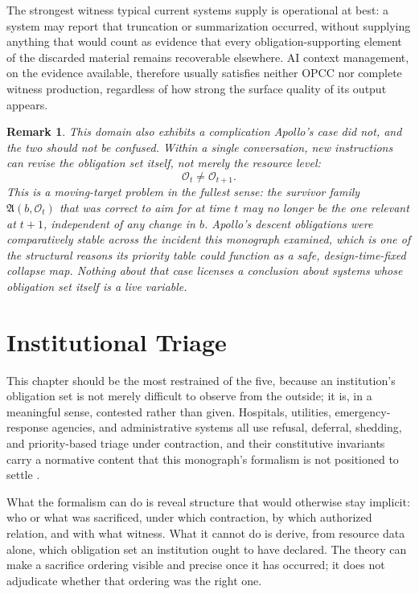\documentclass[11pt]{report}
\newtheorem{remark}[definition]{Remark}
\begin{document}
The strongest witness typical current systems supply is operational at best: a system may report that truncation or summarization occurred, without supplying anything that would count as evidence that every obligation-supporting element of the discarded material remains recoverable elsewhere. AI context management, on the evidence available, therefore usually satisfies neither OPCC nor complete witness production, regardless of how strong the surface quality of its output appears.

\begin{remark}
This domain also exhibits a complication Apollo's case did not, and the two should not be confused. Within a single conversation, new instructions can revise the obligation set itself, not merely the resource level:
\[
\mathcal O_t \ne \mathcal O_{t+1}.
\]
This is a moving-target problem in the fullest sense: the survivor family $\mathfrak A(b, \mathcal O_t)$ that was correct to aim for at time $t$ may no longer be the one relevant at $t+1$, independent of any change in $b$. Apollo's descent obligations were comparatively stable across the incident this monograph examined, which is one of the structural reasons its priority table could function as a safe, design-time-fixed collapse map. Nothing about that case licenses a conclusion about systems whose obligation set itself is a live variable.
\end{remark}

\chapter{Institutional Triage}

This chapter should be the most restrained of the five, because an institution's obligation set is not merely difficult to observe from the outside; it is, in a meaningful sense, contested rather than given. Hospitals, utilities, emergency-response agencies, and administrative systems all use refusal, deferral, shedding, and priority-based triage under contraction, and their constitutive invariants carry a normative content that this monograph's formalism is not positioned to settle \cite{lipsky1980,iom2009,iom2012}.

What the formalism can do is reveal structure that would otherwise stay implicit: who or what was sacrificed, under which contraction, by which authorized relation, and with what witness. What it cannot do is derive, from resource data alone, which obligation set an institution ought to have declared. The theory can make a sacrifice ordering visible and precise once it has occurred; it does not adjudicate whether that ordering was the right one.
\end{document}
